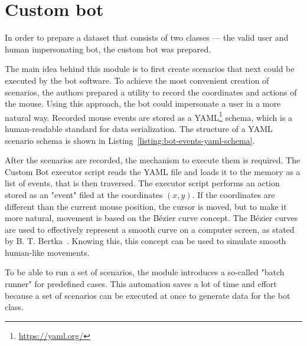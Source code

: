 \section{Custom bot}\label{sec:custom-bot}
In order to prepare a dataset that consists of two classes --- the valid user and human impersonating bot, the custom bot was prepared.

The main idea behind this module is to first create scenarios that next could be executed by the bot software.
To achieve the most convenient creation of scenarios, the authors prepared a utility to record the coordinates and actions of the mouse.
Using this approach, the bot could impersonate a user in a more natural way.
Recorded mouse events are stored as a YAML\footnote{\url{https://yaml.org/}} schema, which is a human-readable standard for data serialization.
The structure of a YAML scenario schema is shown in Listing~\ref{listing:bot-events-yaml-schema}.

% 

After the scenarios are recorded, the mechanism to execute them is required.
The Custom Bot executor script reads the YAML file and loads it to the memory as a list of events, that is then traversed.
The executor script performs an action stored as an "event" filed at the coordinates $(x, y)$.
If the coordinates are different than the current mouse position, the cursor is moved, but to make it more natural, movement is based on the Bézier curve concept.
The Bézier curves are used to effectively represent a smooth curve on a computer screen, as stated by B. T. Bertka~\cite{bezier-curves}. Knowing this, this concept can be used to simulate smooth human-like movements.

To be able to run a set of scenarios, the module introduces a so-called "batch runner" for predefined cases.
This automation saves a lot of time and effort because a set of scenarios can be executed at once to generate data for the bot class.

